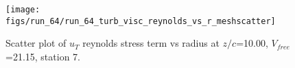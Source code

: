 \begin{figure}[H]
\centering
\texttt{[image: figs/run\_64/run\_64\_turb\_visc\_reynolds\_vs\_r\_meshscatter]}
\caption{Scatter plot of $
u_T$ reynolds stress term vs radius at $z/c$=10.00, $V_{free}$=21.15, station 7.}
\label{fig:run_64_turb_visc_reynolds_vs_r_meshscatter}
\end{figure}


